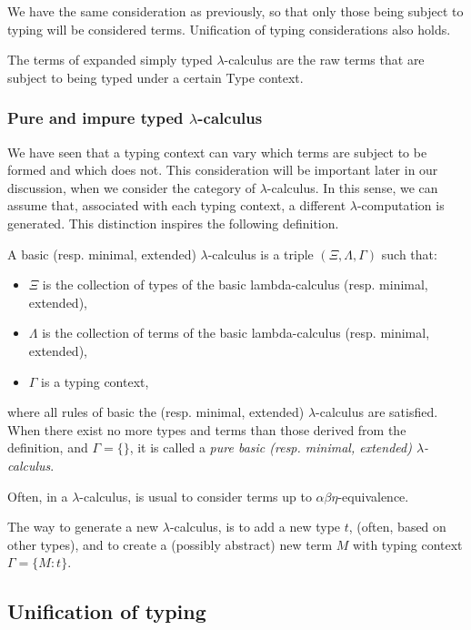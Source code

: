 We have the same consideration as previously, so that only those being subject to typing will be considered terms. Unification of typing considerations also holds.
\begin{definition}
  The terms of expanded simply typed $\lambda$-calculus are the raw terms that are subject to being typed under a certain Type context.
\end{definition}
\subsubsection{Pure and impure typed $\lambda$-calculus}
\label{section:pureandimpure}
We have seen that a typing context can vary which terms are subject to be formed and which does not. This consideration will be important later in our discussion, when we consider the category of $\lambda$-calculus. In this sense, we can assume that, associated with each typing context, a different $\lambda$-computation is generated. This distinction inspires the following definition.


\begin{definition}
  A basic (resp. minimal, extended) $\lambda$-calculus is a triple $(\Xi, \Lambda, \Gamma)$ such that:
  \begin{itemize}
  \item $\Xi$ is the collection of types of the basic lambda-calculus (resp. minimal, extended),
  \item $\Lambda$ is the collection of terms of the basic lambda-calculus (resp. minimal, extended),
  \item $\Gamma$ is a typing context,
  \end{itemize}
  where all rules of basic the (resp. minimal, extended) $\lambda$-calculus are satisfied. When there
  exist no more types and terms than those derived from the definition, and $\Gamma=\{\}$, it is called a \emph{pure basic (resp. minimal, extended) $\lambda$-calculus}.   
\end{definition}
\begin{remark}
  Often, in a $\lambda$-calculus, is usual to consider terms up to $\alpha\beta\eta$-equivalence. 
\end{remark}

The way to generate a new $\lambda$-calculus, is to add a new type $t$, (often, based on other types), and to create a (possibly abstract) new term $M$ with typing context $\Gamma = \{M:t\}$.
\subsection{Unification of typing}

